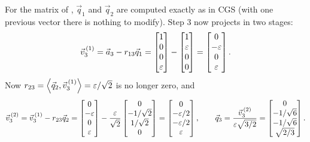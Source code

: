 \begin{example}
  \label{ex:mgs-lauchli}
  For the matrix of , $\vec{q}_1$ and $\vec{q}_2$ are computed exactly as in CGS (with one previous vector there is nothing to modify). Step 3 now projects in two stages:
  \begin{equation}
    \vec{v}_3^{\,(1)} = \vec{a}_3 - r_{13}\vec{q}_1 = \begin{bmatrix} 1 \\ 0 \\ 0 \\ \varepsilon \end{bmatrix} - \begin{bmatrix} 1 \\ \varepsilon \\ 0 \\ 0 \end{bmatrix} = \begin{bmatrix} 0 \\ -\varepsilon \\ 0 \\ \varepsilon \end{bmatrix}.
  \end{equation}
  Now $r_{23} = \left\langle \vec{q}_2, \vec{v}_3^{\,(1)} \right\rangle = \varepsilon/\sqrt{2}$ is no longer zero, and
  \begin{equation}
    \vec{v}_3^{\,(2)} = \vec{v}_3^{\,(1)} - r_{23}\vec{q}_2 = \begin{bmatrix} 0 \\ -\varepsilon \\ 0 \\ \varepsilon \end{bmatrix} - \frac{\varepsilon}{\sqrt{2}}\begin{bmatrix} 0 \\ -1/\sqrt{2} \\ 1/\sqrt{2} \\ 0 \end{bmatrix} = \begin{bmatrix} 0 \\ -\varepsilon/2 \\ -\varepsilon/2 \\ \varepsilon \end{bmatrix}, \qquad
    \vec{q}_3 = \frac{\vec{v}_3^{\,(2)}}{\varepsilon\sqrt{3/2}} = \begin{bmatrix} 0 \\ -1/\sqrt{6} \\ -1/\sqrt{6} \\ \sqrt{2/3} \end{bmatrix}.
  \end{equation}

\end{example}
